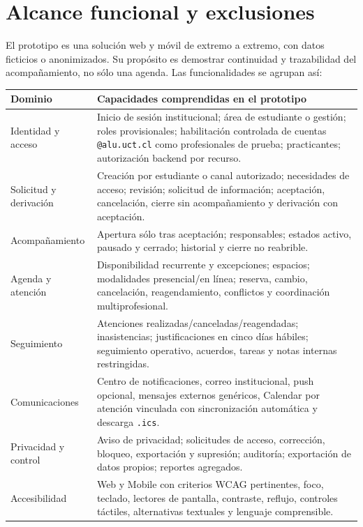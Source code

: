 \documentclass[10pt,a4paper,oneside]{article}
\begin{document}
\section{Alcance funcional y exclusiones}

El prototipo es una solución web y móvil de extremo a extremo, con datos ficticios o anonimizados. Su propósito es demostrar continuidad y trazabilidad del acompañamiento, no sólo una agenda. Las funcionalidades se agrupan así:

\small
\begin{tabularx}{\textwidth}{@{}L{0.22\textwidth}Y@{}}
\toprule
\textbf{Dominio} & \textbf{Capacidades comprendidas en el prototipo}\\
\midrule
Identidad y acceso & Inicio de sesión institucional; área de estudiante o gestión; roles provisionales; habilitación controlada de cuentas \texttt{@alu.uct.cl} como profesionales de prueba; practicantes; autorización backend por recurso.\\
Solicitud y derivación & Creación por estudiante o canal autorizado; necesidades de acceso; revisión; solicitud de información; aceptación, cancelación, cierre sin acompañamiento y derivación con aceptación.\\
Acompañamiento & Apertura sólo tras aceptación; responsables; estados activo, pausado y cerrado; historial y cierre no reabrible.\\
Agenda y atención & Disponibilidad recurrente y excepciones; espacios; modalidades presencial/en línea; reserva, cambio, cancelación, reagendamiento, conflictos y coordinación multiprofesional.\\
Seguimiento & Atenciones realizadas/canceladas/reagendadas; inasistencias; justificaciones en cinco días hábiles; seguimiento operativo, acuerdos, tareas y notas internas restringidas.\\
Comunicaciones & Centro de notificaciones, correo institucional, push opcional, mensajes externos genéricos, Calendar por atención vinculada con sincronización automática y descarga \texttt{.ics}.\\
Privacidad y control & Aviso de privacidad; solicitudes de acceso, corrección, bloqueo, exportación y supresión; auditoría; exportación de datos propios; reportes agregados.\\
Accesibilidad & Web y Mobile con criterios WCAG pertinentes, foco, teclado, lectores de pantalla, contraste, reflujo, controles táctiles, alternativas textuales y lenguaje comprensible.\\
\bottomrule
\end{tabularx}
\normalsize
\end{document}
